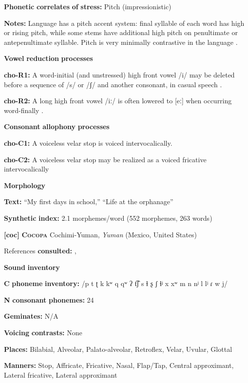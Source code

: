 \textbf{Phonetic} \textbf{correlates} \textbf{of} \textbf{stress:} Pitch (impressionistic)

\textbf{Notes:} Language has a pitch accent system: final syllable of each word has high or rising pitch, while some stems have additional high pitch on penultimate or antepenultimate syllable. Pitch is very minimally contrastive in the language \citep[17]{Broadwell2006}.

\textbf{Vowel} \textbf{reduction} \textbf{processes}

\textbf{cho-R1:} A word-initial (and unstressed) high front vowel /i/ may be deleted before a sequence of /s/ or /ʃ/ and another consonant, in casual speech \citep[19]{Broadwell2006}.

\textbf{cho-R2:} A long high front vowel /iː/ is often lowered to [eː] when occurring word-finally \citep[30]{Broadwell2006}.

\textbf{Consonant} \textbf{allophony} \textbf{processes}

\textbf{cho-C1:} A voiceless velar stop is voiced intervocalically. \citep[15]{Broadwell2006}

\textbf{cho-C2:}  A voiceless velar stop may be realized as a voiced fricative intervocalically \citep[15]{Broadwell2006}

\textbf{Morphology}

\textbf{Text:} “My first days in school,” “Life at the orphanage” \citep[355-360]{Broadwell2006}

\textbf{Synthetic} \textbf{index:} 2.1 morphemes/word (552 morphemes, 263 words)

\textbf{[coc]}   \textbf{\textsc{Cocopa}}    Cochimi-Yuman, \textit{Yuman} (Mexico, United States)

References \textbf{consulted:} \citet{Bendixen1980}, \citet{Crawford1966}

\textbf{Sound} \textbf{inventory}

\textbf{C} \textbf{phoneme} \textbf{inventory:} /p t ʈ k kʷ q qʷ ʔ t͡ʃ s ɬ ʂ ʃ ɬʲ x xʷ m n nʲ l lʲ ɾ w j/

\textbf{N} \textbf{consonant} \textbf{phonemes:} 24

\textbf{Geminates:} N/A

\textbf{Voicing} \textbf{contrasts:} None

\textbf{Places:} Bilabial, Alveolar, Palato-alveolar, Retroflex, Velar, Uvular, Glottal

\textbf{Manners:} Stop, Affricate, Fricative, Nasal, Flap/Tap, Central approximant, Lateral fricative, Lateral approximant

